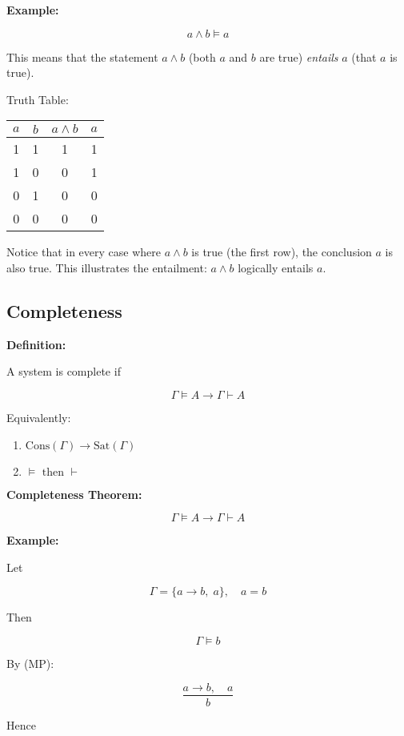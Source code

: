 \documentclass[12pt,a4paper,openany]{article}
\begin{document}
\textbf{Example:} 

\[ a \land b \models a \]

This means that the statement \(a \land b\) (both \(a\) and \(b\) are
true) \emph{entails} \(a\) (that \(a\) is true).

Truth Table:

\begin{center}
\begin{tabular}{|c|c|c|c|}
\hline
\(a\) & \(b\) & \(a \land b\) & \(a\) \\
\hline
1 & 1 & 1 & 1 \\
1 & 0 & 0 & 1 \\
0 & 1 & 0 & 0 \\
0 & 0 & 0 & 0 \\
\hline
\end{tabular}
\end{center}

Notice that in every case where \(a \land b\) is true (the first row),
the conclusion \(a\) is also true. This illustrates the entailment:
\(a \land b\) logically entails \(a\).

\subsection{Completeness}\label{completeness}

\textbf{Definition:}

A system is complete if

\[
\Gamma \models A \to \Gamma \vdash A
\]

Equivalently:

\begin{enumerate}
\item \(\text{Cons}(\Gamma) \to \text{Sat}(\Gamma)\)
\item \(\models \text{ then } \vdash\)
\end{enumerate}

\textbf{Completeness Theorem:}

\[
\Gamma \models A \to \Gamma \vdash A
\]

\textbf{Example:}  

Let

\[
\Gamma = \{a \to b, \; a\}, \quad a = b
\]

Then

\[
\Gamma \models b
\]

By (MP):

\[
\frac{a \to b, \quad a}{b}
\]

Hence
\end{document}
